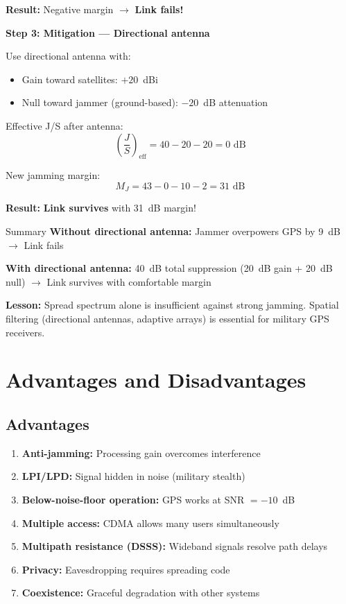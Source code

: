 \textbf{Result:} Negative margin $\rightarrow$ \textbf{Link fails!}

\textbf{Step 3: Mitigation --- Directional antenna}

Use directional antenna with:
\begin{itemize}
\item Gain toward satellites: $+20$~dBi
\item Null toward jammer (ground-based): $-20$~dB attenuation
\end{itemize}

Effective J/S after antenna:
\begin{equation}
\left(\frac{J}{S}\right)_{\mathrm{eff}} = 40 - 20 - 20 = 0\text{ dB}
\end{equation}

New jamming margin:
\begin{equation}
M_J = 43 - 0 - 10 - 2 = 31\text{ dB}
\end{equation}

\textbf{Result:} \textbf{Link survives} with 31~dB margin!

\begin{calloutbox}[colback=black!8!white,colframe=black]{Summary}
\textbf{Without directional antenna:} Jammer overpowers GPS by 9~dB $\rightarrow$ Link fails

\textbf{With directional antenna:} 40~dB total suppression (20~dB gain + 20~dB null) $\rightarrow$ Link survives with comfortable margin

\textbf{Lesson:} Spread spectrum alone is insufficient against strong jamming. Spatial filtering (directional antennas, adaptive arrays) is essential for military GPS receivers.
\end{calloutbox}

\section{Advantages and Disadvantages}

\subsection*{Advantages}

\begin{enumerate}
\item \textbf{Anti-jamming:} Processing gain overcomes interference
\item \textbf{LPI/LPD:} Signal hidden in noise (military stealth)
\item \textbf{Below-noise-floor operation:} GPS works at SNR $= -10$~dB
\item \textbf{Multiple access:} CDMA allows many users simultaneously
\item \textbf{Multipath resistance (DSSS):} Wideband signals resolve path delays
\item \textbf{Privacy:} Eavesdropping requires spreading code
\item \textbf{Coexistence:} Graceful degradation with other systems
\end{enumerate}

